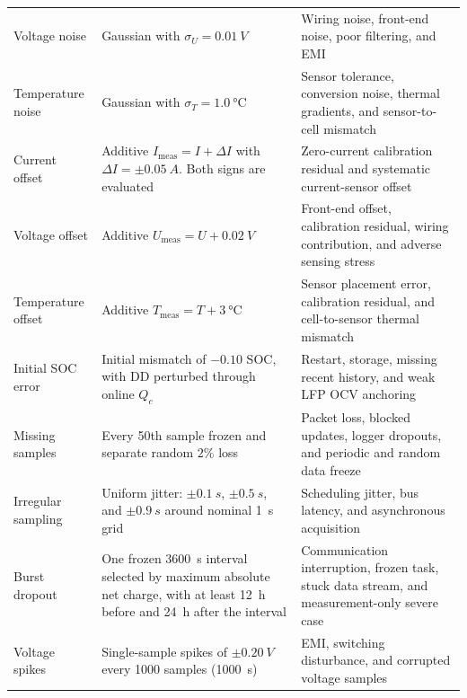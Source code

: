 \documentclass[review,nopreprintline]{elsarticle}
\begin{document}
\begin{longtable}{@{}>{\raggedright\arraybackslash}p{1.90cm}>{\raggedright\arraybackslash}p{3.50cm}>{\raggedright\arraybackslash}p{5.55cm}@{}}
    \addlinespace[3.5pt]
    Voltage noise & Gaussian with $\sigma_U=\SI{0.01}{V}$ & Wiring noise, front-end noise, poor filtering, and EMI \cite{liRobustnessSOCEstimation2015,BQ7961616SeriesBattery2023,aielloElectromagneticSusceptibilityBattery2020} \\
    \addlinespace[3.5pt]
    Temperature noise & Gaussian with $\sigma_T=\SI{1.0}{\celsius}$ & Sensor tolerance, conversion noise, thermal gradients, and sensor-to-cell mismatch \cite{10sBatteryPack,wangFusionEstimationLithiumion2022} \\
    \addlinespace[2pt]
    Current offset & Additive $I_{\mathrm{meas}}=I+\Delta I$ with $\Delta I=\pm\SI{0.05}{A}$. Both signs are evaluated & Zero-current calibration residual and systematic current-sensor offset \cite{DesignConsiderationsCurrent,TMCS11083Functional,TLE4972HighPrecision} \\
    \addlinespace[2pt]
    Voltage offset & Additive $U_{\mathrm{meas}}=U+\SI{0.02}{V}$ & Front-end offset, calibration residual, wiring contribution, and adverse sensing stress \\
    \addlinespace[2pt]
    Temperature offset & Additive $T_{\mathrm{meas}}=T+\SI{3}{\celsius}$ & Sensor placement error, calibration residual, and cell-to-sensor thermal mismatch \\
    \addlinespace[2pt]
    Initial SOC error & Initial mismatch of $-0.10$ SOC, with DD perturbed through online $Q_c$ & Restart, storage, missing recent history, and weak LFP OCV anchoring \cite{liRobustnessSOCEstimation2015,gaoEnhancedStateofchargeEstimation2022} \\
    \addlinespace[3.5pt]
    Missing samples & Every 50th sample frozen and separate random $2\%$ loss & Packet loss, blocked updates, logger dropouts, and periodic and random data freeze \cite{naseriReliableWirelessBMS2025,liuAssessingImpactSampling2025} \\
    \addlinespace[3.5pt]
    Irregular sampling & Uniform jitter: $\pm\SI{0.1}{s}$, $\pm\SI{0.5}{s}$, and $\pm\SI{0.9}{s}$ around nominal \SI{1}{s} grid & Scheduling jitter, bus latency, and asynchronous acquisition \cite{bergerBenchmarkingBatteryManagement2024,naseriReliableWirelessBMS2025,liuAssessingImpactSampling2025} \\
    \addlinespace[2pt]
    Burst dropout & One frozen \SI{3600}{s} interval selected by maximum absolute net charge, with at least 12~h before and 24~h after the interval & Communication interruption, frozen task, stuck data stream, and measurement-only severe case \cite{bergerBenchmarkingBatteryManagement2024,naseriReliableWirelessBMS2025} \\
    \addlinespace[2pt]
    Voltage spikes & Single-sample spikes of $\pm\SI{0.20}{V}$ every 1000 samples (\SI{1000}{s}) & EMI, switching disturbance, and corrupted voltage samples \cite{aielloElectromagneticSusceptibilityBattery2020} \\
\end{longtable}
\endgroup
\end{document}
